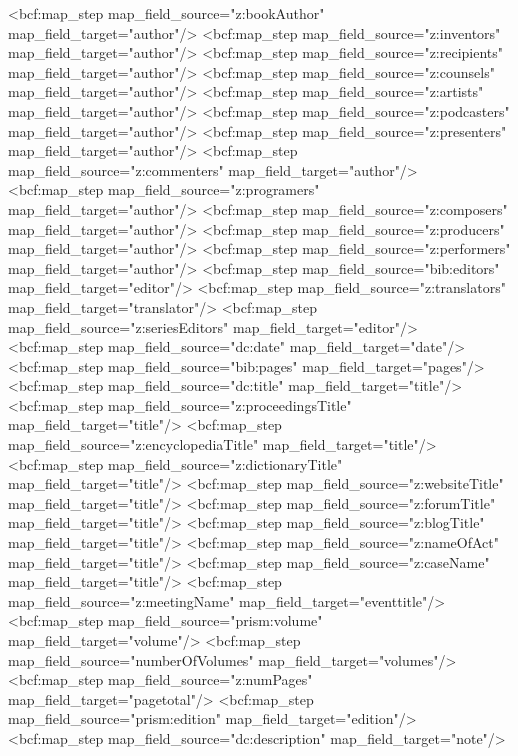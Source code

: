        <bcf:map_step map_field_source="z:bookAuthor" map_field_target="author"/>
        <bcf:map_step map_field_source="z:inventors" map_field_target="author"/>
        <bcf:map_step map_field_source="z:recipients" map_field_target="author"/>
        <bcf:map_step map_field_source="z:counsels" map_field_target="author"/>
        <bcf:map_step map_field_source="z:artists" map_field_target="author"/>
        <bcf:map_step map_field_source="z:podcasters" map_field_target="author"/>
        <bcf:map_step map_field_source="z:presenters" map_field_target="author"/>
        <bcf:map_step map_field_source="z:commenters" map_field_target="author"/>
        <bcf:map_step map_field_source="z:programers" map_field_target="author"/>
        <bcf:map_step map_field_source="z:composers" map_field_target="author"/>
        <bcf:map_step map_field_source="z:producers" map_field_target="author"/>
        <bcf:map_step map_field_source="z:performers" map_field_target="author"/>
        <bcf:map_step map_field_source="bib:editors" map_field_target="editor"/>
        <bcf:map_step map_field_source="z:translators" map_field_target="translator"/>
        <bcf:map_step map_field_source="z:seriesEditors" map_field_target="editor"/>
        <bcf:map_step map_field_source="dc:date" map_field_target="date"/>
        <bcf:map_step map_field_source="bib:pages" map_field_target="pages"/>
        <bcf:map_step map_field_source="dc:title" map_field_target="title"/>
        <bcf:map_step map_field_source="z:proceedingsTitle" map_field_target="title"/>
        <bcf:map_step map_field_source="z:encyclopediaTitle" map_field_target="title"/>
        <bcf:map_step map_field_source="z:dictionaryTitle" map_field_target="title"/>
        <bcf:map_step map_field_source="z:websiteTitle" map_field_target="title"/>
        <bcf:map_step map_field_source="z:forumTitle" map_field_target="title"/>
        <bcf:map_step map_field_source="z:blogTitle" map_field_target="title"/>
        <bcf:map_step map_field_source="z:nameOfAct" map_field_target="title"/>
        <bcf:map_step map_field_source="z:caseName" map_field_target="title"/>
        <bcf:map_step map_field_source="z:meetingName" map_field_target="eventtitle"/>
        <bcf:map_step map_field_source="prism:volume" map_field_target="volume"/>
        <bcf:map_step map_field_source="numberOfVolumes" map_field_target="volumes"/>
        <bcf:map_step map_field_source="z:numPages" map_field_target="pagetotal"/>
        <bcf:map_step map_field_source="prism:edition" map_field_target="edition"/>
        <bcf:map_step map_field_source="dc:description" map_field_target="note"/>
